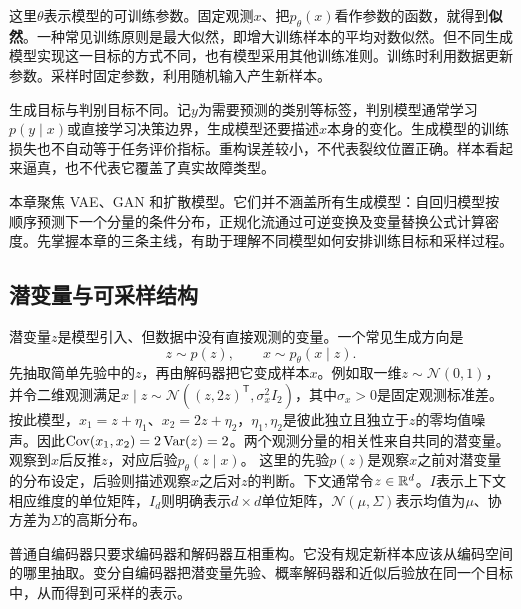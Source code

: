 这里$\theta$表示模型的可训练参数。固定观测$x$、把$p_{\theta}(x)$看作参数的函数，就得到\textbf{似然}。一种常见训练原则是最大似然，即增大训练样本的平均对数似然。但不同生成模型实现这一目标的方式不同，也有模型采用其他训练准则。训练时利用数据更新参数。采样时固定参数，利用随机输入产生新样本。

生成目标与判别目标不同。记$y$为需要预测的类别等标签，判别模型通常学习$p(y\mid x)$或直接学习决策边界，生成模型还要描述$x$本身的变化。生成模型的训练损失也不自动等于任务评价指标。重构误差较小，不代表裂纹位置正确。样本看起来逼真，也不代表它覆盖了真实故障类型。

本章聚焦 VAE、GAN 和扩散模型。它们并不涵盖所有生成模型：自回归模型按顺序预测下一个分量的条件分布，正规化流通过可逆变换及变量替换公式计算密度。先掌握本章的三条主线，有助于理解不同模型如何安排训练目标和采样过程。

\subsection{潜变量与可采样结构}

潜变量$z$是模型引入、但数据中没有直接观测的变量。一个常见生成方向是
\[
z\sim p(z),\qquad x\sim p_{\theta}(x\mid z).
\]
先抽取简单先验中的$z$，再由解码器把它变成样本$x$。例如取一维$z\sim\mathcal N(0,1)$，并令二维观测满足$x\mid z\sim\mathcal N((z,2z)^{\mathsf T},\sigma_x^2I_2)$，其中$\sigma_x>0$是固定观测标准差。按此模型，$x_1=z+\eta_1$、$x_2=2z+\eta_2$，$\eta_1,\eta_2$是彼此独立且独立于$z$的零均值噪声。因此$\operatorname{Cov}(x_1,x_2)=2\operatorname{Var}(z)=2$。两个观测分量的相关性来自共同的潜变量。观察到$x$后反推$z$，对应后验$p_{\theta}(z\mid x)$。
这里的先验$p(z)$是观察$x$之前对潜变量的分布设定，后验则描述观察$x$之后对$z$的判断。下文通常令$z\in\mathbb{R}^d$。$I$表示上下文相应维度的单位矩阵，$I_d$则明确表示$d\times d$单位矩阵，$\mathcal N(\mu,\Sigma)$表示均值为$\mu$、协方差为$\Sigma$的高斯分布。

普通自编码器只要求编码器和解码器互相重构。它没有规定新样本应该从编码空间的哪里抽取。变分自编码器把潜变量先验、概率解码器和近似后验放在同一个目标中，从而得到可采样的表示。


